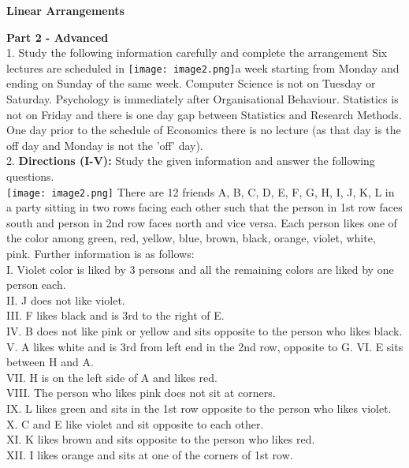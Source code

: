 \documentclass[
]{article}
\author{}
\date{}
\begin{document}
	
 

\begin{center}
	{\Large \textbf{Linear Arrangements \\}}
\end{center}

{\large \textbf{ Part 2 - Advanced \\}}
1. Study the following information carefully and complete the arrangement
Six lectures are scheduled in \texttt{[image: image2.png]}a week starting from Monday and ending on Sunday of the
same week. Computer Science is not on Tuesday or Saturday. Psychology is immediately
after Organisational Behaviour. Statistics is not on Friday and there is one day gap between
Statistics and Research Methods. One day prior to the schedule of Economics there is no
lecture (as that day is the off day and Monday is not the ’off’ day).\\

2. \textbf{Directions (I-V):} Study the given information and answer the following questions.\\
\texttt{[image: image2.png]}
There are 12 friends A, B, C, D, E, F, G, H, I, J, K, L in a party sitting in two rows facing each
other such that the person in 1st row faces south and person in 2nd row faces north and vice
versa. Each person likes one of the color among green, red, yellow, blue, brown, black,
orange, violet, white, pink. Further information is as follows:\\
I. Violet color is liked by 3 persons and all the remaining colors are liked by one person
each.\\
II. J does not like violet.\\
III. F likes black and is 3rd to the right of E.\\
IV. B does not like pink or yellow and sits opposite to the person who likes black.\\
V. A likes white and is 3rd from left end in the 2nd row, opposite to G.
VI. E sits between H and A.\\
VII. H is on the left side of A and likes red.\\
VIII. The person who likes pink does not sit at corners.\\
IX. L likes green and sits in the 1st row opposite to the person who likes violet.\\
X. C and E like violet and sit opposite to each other.\\
XI. K likes brown and sits opposite to the person who likes red.\\
XII. I likes orange and sits at one of the corners of 1st row.\\
\end{document}
